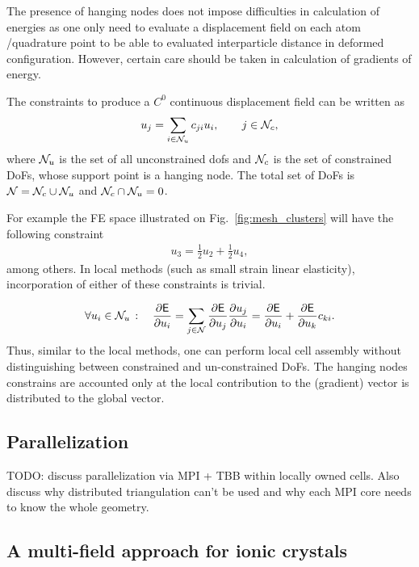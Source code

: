 \documentclass[a4paper,10pt]{article}
\newcommand{\reffig}[1]{Fig.~\ref{fig:#1}}
\def\msf  #1{           \mbox{\!\!      $\sf #1$}}
\def\mcl  #1{               {\cal #1}}
\begin{document}
The presence of hanging nodes does not impose difficulties in calculation of energies as one only need to evaluate a displacement field on each atom /quadrature point to be able to evaluated interparticle distance in deformed configuration. However, certain care should be taken in calculation of gradients of energy. 

The constraints to produce a $C^0$ continuous displacement field can be written as
\begin{align}
u_j = \sum_{i \in \mcl N_{u}} c_{ji} u_i, \qquad   j \in \mcl N_{c} ,
\end{align}
where  $\mcl N_{u}$ is the set of all unconstrained dofs and $\mcl N_c$ is the set of constrained DoFs,
whose support point is a hanging node. The total set of DoFs is $\mcl N = \mcl N_c \cup \mcl N_u$ and $\mcl N_c \cap \mcl N_u = 0$.

For example the FE space illustrated on \reffig{mesh_clusters} will have the following constraint
\begin{align}
u_3 = \frac{1}{2} u_2 + \frac{1}{2} u_4,
\end{align}
among others. 
In local methods (such as small strain linear elasticity), incorporation of either of these constraints is trivial.


\begin{align}
\begin{split}
\forall u_i \in \mcl N_{u} \,: \quad 
\frac{\partial \msf E }{\partial u_i} 
= \sum_{j \in \mcl N} \frac{\partial \msf E }{\partial u_j} \frac{\partial u_j }{\partial u_i}  
= \frac{\partial \msf E }{\partial u_i} + \frac{\partial \msf E }{\partial u_k} c_{ki} .
\end{split}
\end{align}
Thus, similar to the local methods, one can perform local cell assembly without distinguishing between constrained and un-constrained DoFs.
The hanging nodes constrains are accounted only at the local contribution to the (gradient) vector is distributed to the global vector.

\subsection{Parallelization}


{\color{red}TODO}: discuss parallelization via MPI + TBB within locally owned cells. Also discuss why distributed triangulation can't be used and why each MPI core needs to know the whole geometry.

\subsection{A multi-field approach for ionic crystals}
\end{document}
